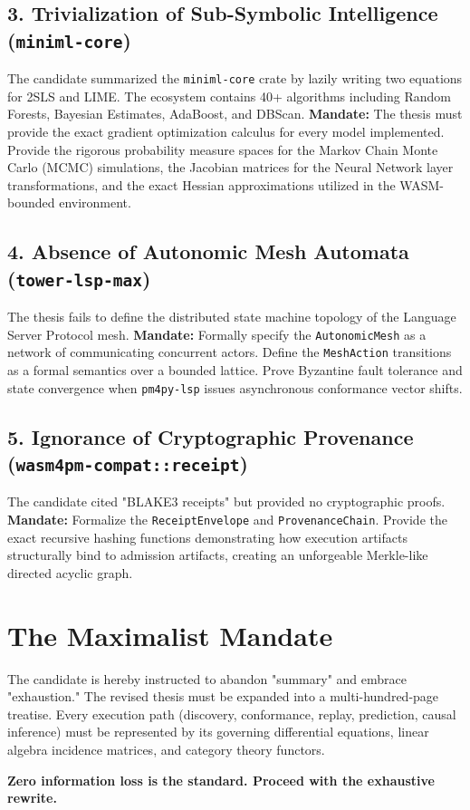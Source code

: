 \documentclass[11pt,a4paper]{article}
\begin{document}
\subsection{3. Trivialization of Sub-Symbolic Intelligence (\texttt{miniml-core})}
The candidate summarized the \texttt{miniml-core} crate by lazily writing two equations for 2SLS and LIME. The ecosystem contains 40+ algorithms including Random Forests, Bayesian Estimates, AdaBoost, and DBScan.
\textbf{Mandate:} The thesis must provide the exact gradient optimization calculus for every model implemented. Provide the rigorous probability measure spaces for the Markov Chain Monte Carlo (MCMC) simulations, the Jacobian matrices for the Neural Network layer transformations, and the exact Hessian approximations utilized in the WASM-bounded environment.

\subsection{4. Absence of Autonomic Mesh Automata (\texttt{tower-lsp-max})}
The thesis fails to define the distributed state machine topology of the Language Server Protocol mesh. 
\textbf{Mandate:} Formally specify the \texttt{AutonomicMesh} as a network of communicating concurrent actors. Define the \texttt{MeshAction} transitions as a formal semantics over a bounded lattice. Prove Byzantine fault tolerance and state convergence when \texttt{pm4py-lsp} issues asynchronous conformance vector shifts.

\subsection{5. Ignorance of Cryptographic Provenance (\texttt{wasm4pm-compat::receipt})}
The candidate cited "BLAKE3 receipts" but provided no cryptographic proofs.
\textbf{Mandate:} Formalize the \texttt{ReceiptEnvelope} and \texttt{ProvenanceChain}. Provide the exact recursive hashing functions demonstrating how execution artifacts structurally bind to admission artifacts, creating an unforgeable Merkle-like directed acyclic graph.

\section*{The Maximalist Mandate}
The candidate is hereby instructed to abandon "summary" and embrace "exhaustion." The revised thesis must be expanded into a multi-hundred-page treatise. Every execution path (discovery, conformance, replay, prediction, causal inference) must be represented by its governing differential equations, linear algebra incidence matrices, and category theory functors. 

\textbf{Zero information loss is the standard. Proceed with the exhaustive rewrite.}
\end{document}
